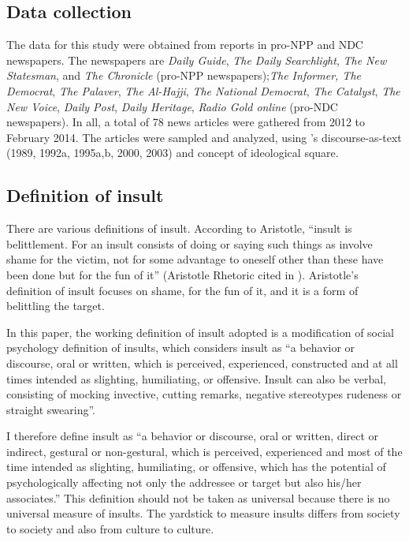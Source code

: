 \documentclass[output=paper,modfonts]{langscibook}
\begin{document}
\subsection{Data collection}\label{sec:ofori:1.2}

The data for this study were obtained from reports in pro-NPP and NDC newspapers. The newspapers are \textit{Daily Guide}, \textit{The Daily Searchlight}, \textit{The New Statesman}, and \textit{The Chronicle} (pro-NPP newspapers);\textit{The Informer, The Democrat}, \textit{The Palaver}, \textit{The Al-Hajji}, \textit{The National Democrat}, \textit{The Catalyst}, \textit{The New Voice}, \textit{Daily Post}, \textit{Daily Heritage}, \textit{Radio Gold online} (pro-NDC newspapers). In all, a total of 78 news articles were gathered from 2012 to February 2014. The articles were sampled and analyzed, using \citeauthor{Fairclough1989}’s discourse-as-text (1989, 1992a, 1995a,b, 2000, 2003) and  concept of ideological square. 

\subsection{Definition of insult}\label{sec:ofori:1.3}

There are various definitions of insult. According to Aristotle, “insult is belittlement. For an insult consists of doing or saying such things as involve shame for the victim, not for some advantage to oneself other than these have been done but for the fun of it” (Aristotle Rhetoric cited in \citealt{Yiannis1998}). Aristotle’s definition of insult focuses on shame, for the fun of it, and it is a form of belittling the target. 

In this paper, the working definition of insult adopted is a modification of  social psychology definition of insults, which considers insult as “a behavior or discourse, oral or written, which is perceived, experienced, constructed and at all times intended as slighting, humiliating, or offensive. Insult can also be verbal, consisting of mocking invective, cutting remarks, negative stereotypes rudeness or straight swearing”.

I therefore define insult as “a behavior or discourse, oral or written, direct or indirect, gestural or non-gestural, which is perceived, experienced and most of the time intended as slighting, humiliating, or offensive, which has the potential of psychologically affecting not only the addressee or target but also his/her associates.” This definition should not be taken as universal because there is no universal measure of insults. The yardstick to measure insults differs from society to society and also from culture to culture.
\end{document}
